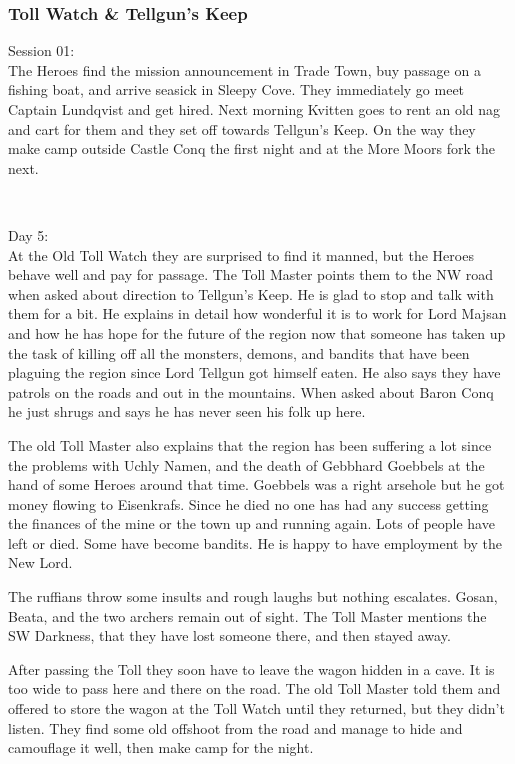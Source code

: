 \subsubsection*{Toll Watch \& Tellgun's Keep}
\forceindent Session 01:\\                                              %
The Heroes find the mission announcement in Trade Town, buy passage on a fishing boat, and arrive seasick in Sleepy Cove. They immediately go meet Captain Lundqvist and get hired.
Next morning Kvitten goes to rent an old nag and cart for them and they set off towards Tellgun's Keep. On the way they make camp outside Castle Conq the first night and at the More Moors fork the next.

\

Day 5:\\
At the Old Toll Watch they are surprised to find it manned, but the Heroes behave well and pay for passage. The Toll Master points them to the NW road when asked about direction to Tellgun's Keep. He is glad to stop and talk with them for a bit. He explains in detail how wonderful it is to work for Lord Majsan and how he has hope for the future of the region now that someone has taken up the task of killing off all the monsters, demons, and bandits that have been plaguing the region since Lord Tellgun got himself eaten. He also says they have patrols on the roads and out in the mountains. When asked about Baron Conq he just shrugs and says he has never seen his folk up here.

The old Toll Master also explains that the region has been suffering a lot since the problems with Uchly Namen, and the death of Gebbhard Goebbels at the hand of some Heroes around that time. Goebbels was a right arsehole but he got money flowing to Eisenkrafs. Since he died no one has had any success getting the finances of the mine or the town up and running again. Lots of people have left or died. Some have become bandits. He is happy to have employment by the New Lord.

The ruffians throw some insults and rough laughs but nothing escalates. Gosan, Beata, and the two archers remain out of sight. The Toll Master mentions the SW Darkness, that they have lost someone there, and then stayed away.

After passing the Toll they soon have to leave the wagon hidden in a cave. It is too wide to pass here and there on the road. The old Toll Master told them and offered to store the wagon at the Toll Watch until they returned, but they didn't listen. They find some old offshoot from the road and manage to hide and camouflage it well, then make camp for the night.

